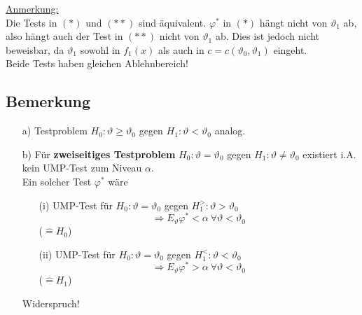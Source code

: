 \documentclass[a4paper,11pt,twoside,titlepage]{article}
\begin{document}
\underline{Anmerkung:}\\
Die Tests in $(\ast)$ und $(\ast\ast)$ sind äquivalent. $\varphi^\ast$ in $(\ast)$ hängt nicht von $\vartheta_1$ ab, also hängt auch der Test in $(\ast\ast)$ nicht von $\vartheta_1$ ab. Dies ist jedoch nicht beweisbar, da $\vartheta_1$ sowohl in $f_1(x)$ als auch in $c=c(\vartheta_0,\vartheta_1)$ eingeht.\\
Beide Tests haben gleichen Ablehnbereich!

\subsection{Bemerkung}
\begin{itemize}
\item[a)] Testproblem $H_0:\vartheta\geq\vartheta_0$ gegen $H_1:\vartheta<\vartheta_0$ analog.
\item[b)] Für \textbf{zweiseitiges Testproblem} $H_0:\vartheta=\vartheta_0$ gegen $H_1:\vartheta\neq\vartheta_0$ existiert i.A. kein UMP-Test zum Niveau $\alpha$.\\
Ein solcher Test $\varphi^\ast$ wäre 
\begin{itemize}
\item[(i)] UMP-Test für $H_0:\vartheta=\vartheta_0$ gegen $H_1^>:\vartheta>\vartheta_0$
\[\Rightarrow E_\vartheta\varphi^\ast<\alpha\ \forall\vartheta<\vartheta_0\]
($\hat{=} H_0$)
\item[(ii)] UMP-Test für $H_0:\vartheta=\vartheta_0$ gegen $H_1^<:\vartheta<\vartheta_0$
\[\Rightarrow E_\vartheta\varphi^\ast>\alpha\ \forall\vartheta<\vartheta_0\]
($\hat{=} H_1$)
\end{itemize}
Widerspruch!
\end{itemize}

\end{document}
